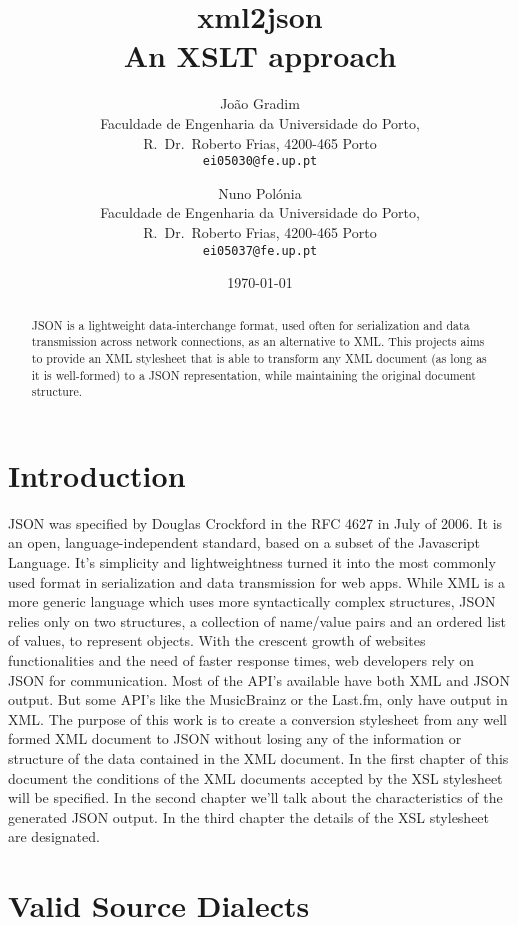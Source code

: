 \documentclass[twocolumn,twoside,10pt,a4paper]{article}
\title{xml2json\\\footnotesize{An XSLT approach}}
\author{João Gradim\\
\small Faculdade de Engenharia da Universidade do Porto,\\[-0.8ex]
\small R.\ Dr.\ Roberto Frias, 4200-465 Porto\\[-0.8ex]
\small \texttt{ei05030@fe.up.pt}\\
\and
Nuno Polónia\\
\small Faculdade de Engenharia da Universidade do Porto,\\[-0.8ex]
\small R.\ Dr.\ Roberto Frias, 4200-465 Porto\\[-0.8ex]
\small \texttt{ei05037@fe.up.pt}
}
\date{\today}
\begin{document}
\maketitle
\thispagestyle{plain}

\begin{abstract}

JSON is a lightweight data-interchange format, used often for serialization and data transmission across network connections, as an alternative to XML\cite{json_format}. This projects aims to provide an XML stylesheet that is able to transform any XML document (as long as it is well-formed) to a JSON representation, while maintaining the original document structure.

\end{abstract}
\section{Introduction}\label{sec:intro}


JSON was specified by Douglas Crockford in the RFC 4627 in July of 2006\cite{rfc4627}. It is an open, language-independent standard, based on a subset of the Javascript Language.
It's simplicity and lightweightness turned it into the most commonly used format in serialization and data transmission for web apps. While XML is a more generic language which uses more syntactically complex structures, JSON relies only on two structures, a collection of name/value pairs and an ordered list of values\cite{json_format}, to represent objects. 
With the crescent growth of websites functionalities and the need of faster response times, web developers rely on JSON for communication. Most of the API's available have both XML and JSON output. But some API's like the MusicBrainz or the Last.fm, only have output in XML.
The purpose of this work is to create a conversion stylesheet from any well formed XML document to JSON without losing any of the information or structure of the data contained in the XML document. In the first chapter of this document the conditions of the XML documents accepted by the XSL stylesheet will be specified. In the second chapter we'll talk about the characteristics of the generated JSON output. In the third chapter the details of the XSL stylesheet are designated.
\section{Valid Source Dialects}\label{sec:valid-source-dialects}
\end{document}
